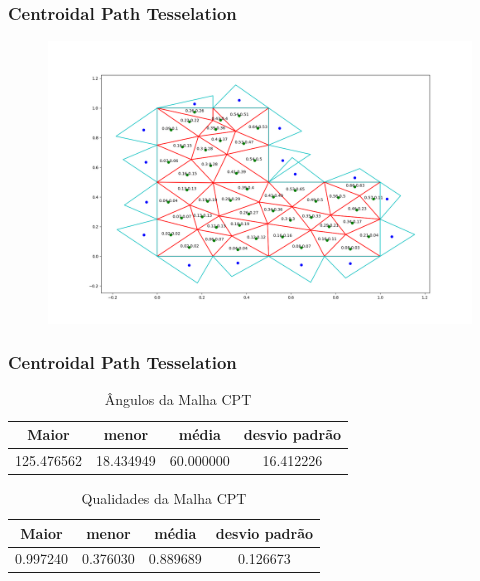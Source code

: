 \documentclass[brazil]{beamer}
\begin{document}
\begin{frame}
  \frametitle{Centroidal Path Tesselation}

  \begin{figure}
    \includegraphics[width=0.6\linewidth]{malha-cpt.png}
  \end{figure}

\end{frame}


\begin{frame}
  \frametitle{Centroidal Path Tesselation}

  \begin{table}[hb]
    \centering
    \par\caption{Ângulos da Malha CPT}
    \begin{tabular}{c|c|c|c}
      Maior      & menor     & média     & desvio padrão \\\hline\hline
      125.476562 & 18.434949 & 60.000000 & 16.412226     \\\hline
    \end{tabular}
    \label{tab:angulos-malha-cpt}
  \end{table}

  \begin{table}[hb]
    \centering
    \par\caption{Qualidades da Malha CPT}
    \begin{tabular}{c|c|c|c}
      Maior    & menor    & média    & desvio padrão \\\hline\hline
      0.997240 & 0.376030 & 0.889689 & 0.126673      \\\hline
    \end{tabular}
    \label{tab:qualidades-malha-cpt}
  \end{table}

\end{frame}
\end{document}

